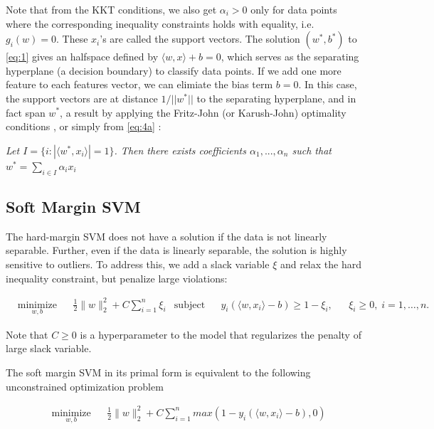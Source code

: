 \documentclass[10pt]{article}
\begin{document}
Note that from the KKT conditions, we also get $\alpha_i > 0 $ only for data points where the corresponding inequality constraints holds with equality, i.e. $g_i(w) = 0$. These $x_i$'s are called the support vectors. The solution $(w^*, b^*)$ to \eqref{eq:1} gives an halfspace defined by $\langle w, x\rangle + b = 0$, which serves as the separating hyperplane (a decision boundary) to classify data points. If we add one more feature to each features vector, we can elimiate the bias term $b = 0$. In this case, the support vectors are at distance $1/||w^*||$ to the separating hyperplane, and in fact span $w^*$, a result by applying the Fritz-John (or Karush-John) optimality conditions \cite{Shalev-Shwartz:2014:UML:2621980}, or simply from \eqref{eq:4a} :

\begin{center}
	\textit{Let $I = \{i: |\langle w^*, x_i\rangle| = 1\}$. Then there exists coefficients $\alpha_1,...,\alpha_n$ such that $w^*  = \sum_{i \in I}^{}\alpha_i x_i$}
\end{center}

\subsection{Soft Margin SVM}
The hard-margin SVM does not have a solution if the data is not linearly separable. Further, even if the data is linearly separable, the solution is highly sensitive to outliers. To address this, we add a slack variable $\xi$ and relax the hard inequality constraint, but penalize large violations:

\begin{equation}\label{eq:1}
\begin{aligned}
& \underset{w,b}{\text{minimize}}
& & \frac{1}{2} \lVert w \rVert_{2}^2 + C \sum_{i=1}^{n}\xi_i
& \text{subject to}
& & y_i(\langle w,x_i \rangle - b) \geq 1 - \xi_i,
& & \xi_i \geq 0, \; i = 1, \ldots, n.
\end{aligned}
\end{equation} 

Note that $C \geq 0$ is a hyperparameter to the model that regularizes the penalty of large slack variable.  

The soft margin SVM in its primal form is equivalent to the following unconstrained optimization problem

\begin{equation}\label{eq:8}
\begin{aligned}
& \underset{w,b}{\text{minimize}}
& & \frac{1}{2} \lVert w \rVert_{2}^2 + C \sum_{i=1}^{n}max(1 - y_i(\langle w, x_i\rangle-b), 0)
\end{aligned}
\end{equation} 
\end{document}
